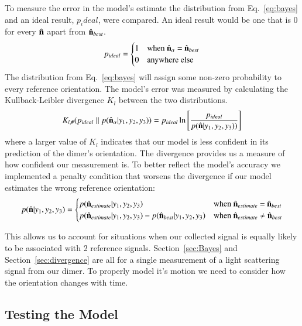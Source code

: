 \documentclass[final, 3p]{elsarticle}
\begin{document}
To measure the error in the model's estimate the distribution from Eq.~\eqref{eq:bayes} and an ideal result, $p_ideal$, were compared.  An ideal result would be one that is 0 for every $\hat{\bf n}$ apart from $\hat{\bf n}_{best}$.
\begin{align}
	p_{ideal} = 
	\begin{cases}
		1 & \text{when $\hat{\bf n}_\alpha$ = $\hat{\bf n}_{best}$}\\
		0 & \text{anywhere else}
	\end{cases}
\end{align}
The distribution from Eq.~\eqref{eq:bayes} will assign some non-zero probability to every reference orientation. The model's error was measured by calculating the Kullback-Leibler divergence $K_l$ between the two distributions.
\begin{align}
	K_{l, \#}(p_{ideal}\parallel p(\hat{\bf n}_\alpha| y_1, y_2, y_3))
	= p_{ideal}\ln \left[\frac{p_{ideal}}{p(\hat{\bf n}| y_1,y_2,y_3))}
	\right]
	\label{eq;kullback}
\end{align}
where a larger value of $K_l$ indicates that our model is less confident in its prediction of the dimer's orientation. The divergence provides us a measure of how confident our measurement is. To better reflect the model's accuracy we implemented a penalty condition that worsens the divergence if our model estimates the wrong reference orientation:
\begin{align}
	p(\hat{\bf n}|y_1,y_2,y_3) = 
	\begin{cases}
		p(\hat{\bf n}_{estimate}|y_1,y_2,y_3) & 
		\text{when $\hat{\bf n}_{estimate}$ = $\hat{\bf n}_{best}$}\\
		p(\hat{\bf n}_{estimate}|y_1,y_2,y_3)-p(\hat{\bf n}_{best}|y_1,y_2,y_3) & \text{when $\hat{\bf n}_{estimate} \ne \hat{\bf n}_{best}$}
	\end{cases}
\end{align}

This allows us to account for situations when our collected signal is equally likely to be associated with 2 reference signals. Section~\ref{sec:Bayes} and Section~\ref{sec:divergence} are all for a single measurement of a light scattering signal from our dimer. To properly model it's motion we need to consider how the orientation changes with time. 
\subsection{Testing the Model}
\label{sec:test}
\end{document}
